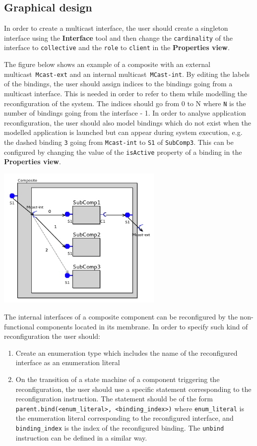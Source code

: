 \documentclass[12pt]{article}
\begin{document}
\subsection{Graphical design}

In order to create a multicast interface, the user should create a singleton interface using the \textbf{Interface} tool and then change the \texttt{cardinality} of the interface to \texttt{collective} and the \texttt{role} to \texttt{client} in the \textbf{Properties view}.

The figure below shows an example of a composite with an external multicast~\texttt{Mcast-ext} and an internal multicast~\texttt{MCast-int}. By editing the labels of the bindings, the user should assign indices to the bindings going from a multicast interface. This is needed in order to refer to them while modelling the reconfiguration of the  system. The indices should go from 0 to N where \texttt{N} is the number of bindings going from the interface - 1. In order to analyse application reconfiguration, the user should also model bindings which do not exist when the modelled application is launched but can appear during system execution, e.g. the dashed binding \texttt{3} going from \texttt{Mcast-int} to \texttt{S1} of \texttt{SubComp3}. This can be configured by changing the value of the \texttt{isActive} property of a binding in the \textbf{Properties view}.

     \centerline{
    \includegraphics[width=8cm]{draws/mcast-compos-vce.jpg}
     }

The internal interfaces of a composite component can be reconfigured by the non-functional components located in its membrane. In order to specify such kind of reconfiguration the user should:

\begin{enumerate}
\item
Create an enumeration type which includes the name of the reconfigured interface as an enumeration literal
\item
On the transition of a state machine of a component triggering the reconfiguration, the user should use a specific statement corresponding to the reconfiguration instruction.
The statement should be of the form \texttt{parent.bind(<enum\_literal>, <binding\_index>)} where \texttt{enum\_literal} is the enumeration literal corresponding to the reconfigured interface, and \texttt{binding\_index} is the index of the reconfigured binding. The \texttt{unbind} instruction can be defined in a similar way.
\end{enumerate}
\end{document}
